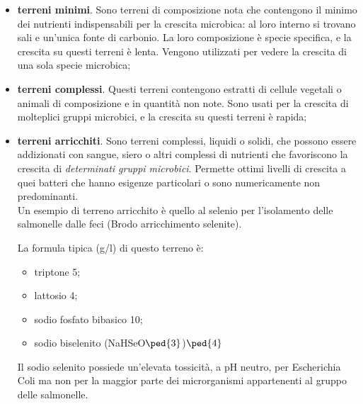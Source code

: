 \documentclass[11pt]{book}
\begin{document}
\begin{itemize}
\item \textbf{terreni minimi}. Sono terreni di composizione nota che contengono il minimo dei nutrienti indispensabili per la crescita microbica: al loro interno si trovano sali e un'unica fonte di carbonio. La loro composizione è specie specifica, e la crescita su questi terreni è lenta. Vengono utilizzati per vedere la crescita di una sola specie microbica;
\item \textbf{terreni complessi}. Questi terreni contengono estratti di cellule vegetali o animali di composizione e in quantità non note. Sono usati per la crescita di molteplici gruppi microbici, e la crescita su questi terreni è rapida;
\item \textbf{terreni arricchiti}. Sono terreni complessi, liquidi o solidi, che possono essere addizionati con sangue, siero o altri complessi di nutrienti che favoriscono la crescita di \emph{determinati gruppi microbici}. Permette ottimi livelli di crescita a quei batteri che hanno esigenze particolari o sono numericamente non predominanti.\\ 
Un esempio di terreno arricchito è quello al selenio per l’isolamento delle salmonelle dalle feci (Brodo arricchimento selenite).

\clearpage

La formula tipica (g/l) di questo terreno è:
\begin{itemize}
\item triptone 5;
\item lattosio 4;
\item sodio fosfato bibasico 10;
\item sodio biselenito (NaHSeO$\ped{3}$)$\ped{4}$
\end{itemize}

Il sodio selenito possiede un'elevata tossicità, a pH neutro, per Escherichia Coli ma non per la maggior parte dei microrganismi appartenenti al gruppo delle salmonelle.


\end{itemize}
\end{document}
